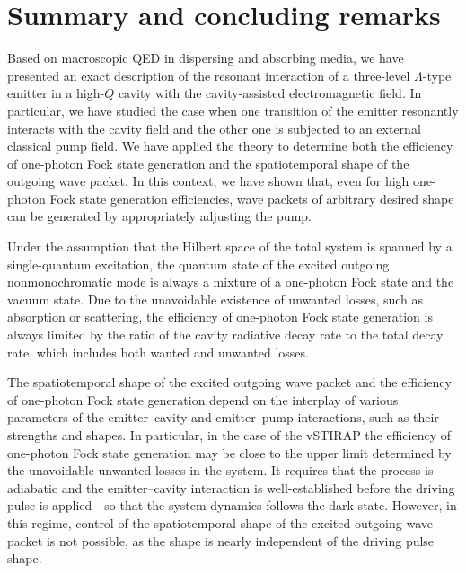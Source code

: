 \documentclass[pra, twocolumn]{revtex4}
\begin{document}
\section{Summary and concluding remarks}
\label{sec9}

Based on macroscopic QED in dispersing and absorbing media, we
have presented an exact description of the resonant interaction of a
three-level $\Lambda$-type emitter in a high-$Q$ cavity with the
cavity-assisted electromagnetic field.
In particular, we have studied the case when one transition
of the emitter resonantly interacts with the cavity field and the
other one is subjected to an external classical pump field.
%
We have applied the theory to determine
both the efficiency of one-photon Fock state generation
and the spatiotemporal shape of the outgoing wave packet.
In this context, we have shown that,
even for high one-photon Fock state generation efficiencies,
wave packets of arbitrary desired shape can be generated by
appropriately adjusting the pump.

Under the
%
assumption that the Hilbert space of the total
system is spanned by
a single-quantum excitation,
the quantum state of the
excited outgoing nonmonochromatic mode is always a mixture of
a one-photon Fock state and
the vacuum state. Due to the unavoidable existence of unwanted losses,
such as absorption or scattering, the efficiency of one-photon Fock
state generation
%
is always limited by the ratio of
the cavity radiative decay rate to the total decay rate, which
includes both wanted
%
and unwanted losses.

The
spatiotemporal shape of the excited outgoing wave packet
and
the efficiency of one-photon Fock state generation
depend on
the interplay of various parameters
of the emitter--cavity and emitter--pump interactions, such as
their strengths
and
shapes.
%
In particular, in the case
of the
vSTIRAP
the efficiency of one-photon Fock state generation may
be close to the upper limit
determined
by the unavoidable
unwanted losses in the system.
It
requires that the process is adiabatic
and the emitter--cavity interaction is well-established before the
driving pulse is applied---so that the system dynamics follows
%
the dark state.
%
However,
in this regime,
control of the spatiotemporal shape
of the excited outgoing wave packet is not possible, as the shape is
%
nearly
independent of the driving pulse shape.
%
\end{document}
